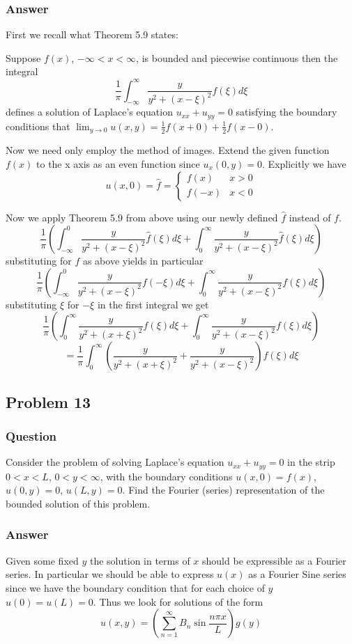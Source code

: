 \documentclass[12pt]{article}
\begin{document}
\subsubsection{Answer}
First we recall what Theorem 5.9 states:

Suppose $f(x)$, $-\infty<x<\infty$, is bounded and piecewise continuous then the integral
\[\frac{1}{\pi} \int_{-\infty}^\infty \frac{y}{y^2+(x-\xi)^2} f(\xi) d\xi\]
defines a solution of Laplace's equation $u_{xx}+u_{yy}=0$ satisfying the boundary conditions that $\lim_{y \to 0} u(x,y)=\frac{1}{2} f(x+0)+\frac{1}{2}f(x-0)$.

Now we need only employ the method of images. Extend the given function $f(x)$ to the x axis as an even function since $u_x(0,y)=0$. Explicitly we have 
\[u(x,0)=\hat{f}=\left\{\begin{array}{lr} f(x) & x>0 \\ f(-x) & x <0 \end{array} \right. \]

Now we apply Theorem 5.9 from above using our newly defined $\hat{f}$ instead of $f$.
\[ \frac{1}{\pi} \left( \int_{-\infty}^0 \frac{y}{y^2+(x-\xi)^2} \hat{f}(\xi) d\xi + \int_{0}^\infty \frac{y}{y^2+(x-\xi)^2} \hat{f}(\xi) d\xi \right) \]
substituting for $f$ as above yields in particular
\[ \frac{1}{\pi} \left( \int_{-\infty}^0 \frac{y}{y^2+(x-\xi)^2} f(-\xi) d\xi + \int_{0}^\infty \frac{y}{y^2+(x-\xi)^2} f(\xi) d\xi \right) \]
substituting $\xi$ for $-\xi$ in the first integral we get
\[ \frac{1}{\pi} \left( \int_0^{\infty} \frac{y}{y^2+(x+\xi)^2} f(\xi) d\xi + \int_{0}^\infty \frac{y}{y^2+(x-\xi)^2} f(\xi) d\xi \right) \]
\[= \frac{1}{\pi}  \int_0^{\infty}\left( \frac{y}{y^2+(x+\xi)^2}  + \frac{y}{y^2+(x-\xi)^2} \right) f(\xi) d\xi  \]


\subsection{Problem 13}
\subsubsection{Question}
Consider the problem of solving Laplace's equation $u_{xx}+u_{yy}=0$ in the strip $0<x<L$, $0<y<\infty$, with the boundary conditions $u(x,0)=f(x)$, $u(0,y)=0$, $u(L,y)=0$. Find the Fourier (series) representation of the bounded solution of this problem.

\subsubsection{Answer}
Given some fixed $y$ the solution in terms of $x$ should be expressible as a Fourier series. In particular we should be able to express $u(x)$ as a Fourier Sine series since we have the boundary condition that for each choice of $y$ $u(0)=u(L)=0$. Thus we look for solutions of the form
\[u(x,y)=\left( \sum_{n=1}^\infty B_n \sin{\frac{n\pi x}{L}}\right) g(y)\]
\end{document}
